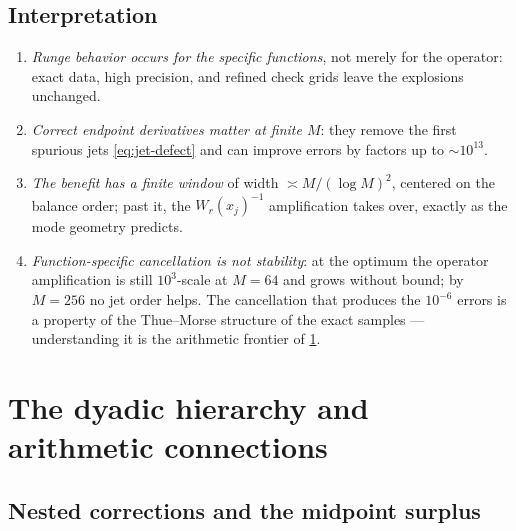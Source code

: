 \subsection{Interpretation}

\begin{enumerate}
\item\emph{Runge behavior occurs for the specific functions}, not
merely for the operator: exact data, high precision, and refined
check grids leave the explosions unchanged.
\item\emph{Correct endpoint derivatives matter at finite $M$}: they
remove the first spurious jets \eqref{eq:jet-defect} and can improve
errors by factors up to $\sim10^{13}$.
\item\emph{The benefit has a finite window} of width
$\asymp M/(\log M)^{2}$, centered on the balance order; past it, the
$W_r(x_j)^{-1}$ amplification takes over, exactly as the mode
geometry predicts.
\item\emph{Function-specific cancellation is not stability}: at the
optimum the operator amplification is still $10^{3}$-scale at
$M=64$ and grows without bound; by $M=256$ no jet order helps.  The
cancellation that produces the $10^{-6}$ errors is a property of the
Thue--Morse structure of the exact samples --- understanding it is
the arithmetic frontier of \cref{sec:connections}.
\end{enumerate}

\section{The dyadic hierarchy and arithmetic connections}
\label{sec:connections}

\subsection{Nested corrections and the midpoint surplus}

